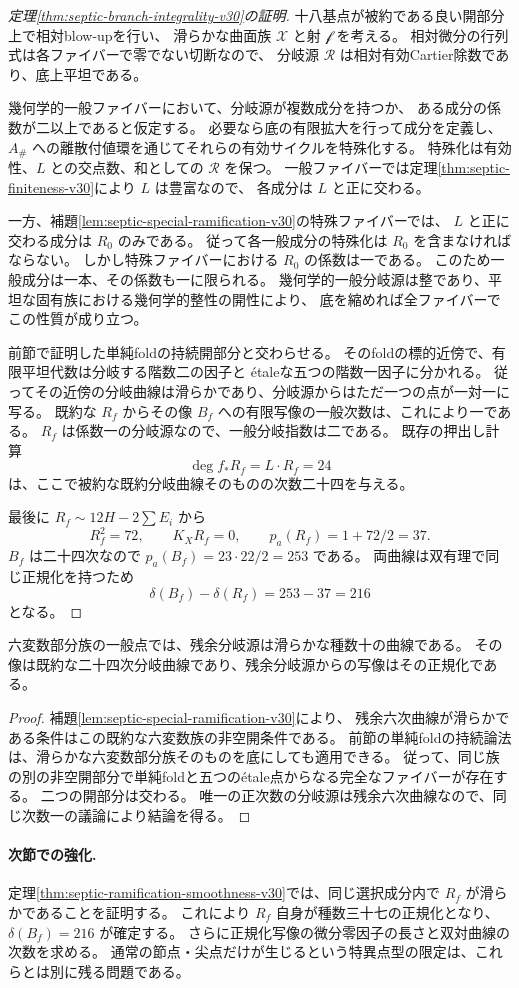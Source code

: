 \begin{proof}[定理\ref{thm:septic-branch-integrality-v30}の証明]
十八基点が被約である良い開部分上で相対blow-upを行い、
滑らかな曲面族 $\mathcal X$ と射 $\mathcal f$ を考える。
相対微分の行列式は各ファイバーで零でない切断なので、
分岐源 $\mathcal R$ は相対有効Cartier除数であり、底上平坦である。

幾何学的一般ファイバーにおいて、分岐源が複数成分を持つか、
ある成分の係数が二以上であると仮定する。
必要なら底の有限拡大を行って成分を定義し、
$A_\#$ への離散付値環を通じてそれらの有効サイクルを特殊化する。
特殊化は有効性、$L$ との交点数、和としての $\mathcal R$ を保つ。
一般ファイバーでは定理\ref{thm:septic-finiteness-v30}により $L$ は豊富なので、
各成分は $L$ と正に交わる。

一方、補題\ref{lem:septic-special-ramification-v30}の特殊ファイバーでは、
$L$ と正に交わる成分は $R_0$ のみである。
従って各一般成分の特殊化は $R_0$ を含まなければならない。
しかし特殊ファイバーにおける $R_0$ の係数は一である。
このため一般成分は一本、その係数も一に限られる。
幾何学的一般分岐源は整であり、平坦な固有族における幾何学的整性の開性により、
底を縮めれば全ファイバーでこの性質が成り立つ。

前節で証明した単純foldの持続開部分と交わらせる。
そのfoldの標的近傍で、有限平坦代数は分岐する階数二の因子と
\'etaleな五つの階数一因子に分かれる。
従ってその近傍の分岐曲線は滑らかであり、分岐源からはただ一つの点が一対一に写る。
既約な $R_f$ からその像 $B_f$ への有限写像の一般次数は、これにより一である。
$R_f$ は係数一の分岐源なので、一般分岐指数は二である。
既存の押出し計算
\[
 \deg f_*R_f=L\cdot R_f=24
\]
は、ここで被約な既約分岐曲線そのものの次数二十四を与える。

最後に $R_f\sim12H-2\sum E_i$ から
\[
 R_f^2=72,\qquad K_XR_f=0,\qquad p_a(R_f)=1+72/2=37.
\]
$B_f$ は二十四次なので $p_a(B_f)=23\cdot22/2=253$ である。
両曲線は双有理で同じ正規化を持つため
\[
 \delta(B_f)-\delta(R_f)=253-37=216
\]
となる。
\end{proof}

\begin{corollary}[六変数収縮部分族の分岐]
\label{cor:septic-contracted-branch-v30}
六変数部分族の一般点では、残余分岐源は滑らかな種数十の曲線である。
その像は既約な二十四次分岐曲線であり、残余分岐源からの写像はその正規化である。
\end{corollary}
\begin{proof}
補題\ref{lem:septic-special-ramification-v30}により、
残余六次曲線が滑らかである条件はこの既約な六変数族の非空開条件である。
前節の単純foldの持続論法は、滑らかな六変数部分族そのものを底にしても適用できる。
従って、同じ族の別の非空開部分で単純foldと五つの\'etale点からなる完全なファイバーが存在する。
二つの開部分は交わる。
唯一の正次数の分岐源は残余六次曲線なので、同じ次数一の議論により結論を得る。
\end{proof}

\paragraph{次節での強化.}
定理\ref{thm:septic-ramification-smoothness-v30}では、同じ選択成分内で
$R_f$ が滑らかであることを証明する。
これにより $R_f$ 自身が種数三十七の正規化となり、$\delta(B_f)=216$ が確定する。
さらに正規化写像の微分零因子の長さと双対曲線の次数を求める。
通常の節点・尖点だけが生じるという特異点型の限定は、これらとは別に残る問題である。
